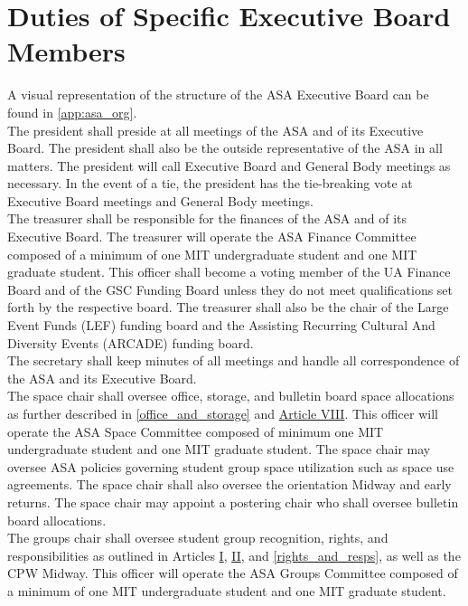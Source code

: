 \documentclass[12pt]{article}
\begin{document}
\section{Duties of Specific Executive Board Members}
A visual representation of the structure of the ASA Executive Board can be found in \ref{app:asa_org}.
\\

The president shall preside at all meetings of the ASA and of its Executive Board. The president shall
also be the outside representative of the ASA in all matters. The president will call Executive Board and
General Body meetings as necessary. In the event of a tie, the president has the tie-breaking vote at
Executive Board meetings and General Body meetings.
\\

The treasurer shall be responsible for the finances of the ASA and of its Executive Board. The treasurer
will operate the ASA Finance Committee composed of a minimum of one MIT undergraduate student
and one MIT graduate student. This officer shall become a voting member of the UA Finance Board
and of the GSC Funding Board unless they do not meet qualifications set forth by the respective board.
The treasurer shall also be the chair of the Large Event Funds (LEF) funding board and the Assisting
Recurring Cultural And Diversity Events (ARCADE) funding board.
\\

The secretary shall keep minutes of all meetings and handle all correspondence of the ASA and its
Executive Board.
\\

The space chair shall oversee office, storage, and bulletin board space allocations as further described
in \ref{office_and_storage} and \hyperref[art:VIII]{Article VIII}. This officer will operate the ASA Space Committee composed of minimum
one MIT undergraduate student and one MIT graduate student. The space chair may oversee ASA
policies governing student group space utilization such as space use agreements. The space chair shall
also oversee the orientation Midway and early returns. The space chair may appoint a postering chair
who shall oversee bulletin board allocations.
\\

The groups chair shall oversee student group recognition, rights, and responsibilities as outlined in
Articles \hyperref[art:I]{I}, \hyperref[art:II]{II}, and \ref{rights_and_resps}, as well as the CPW Midway. This officer will operate the ASA Groups Committee
composed of a minimum of one MIT undergraduate student and one MIT graduate student.
\end{document}
